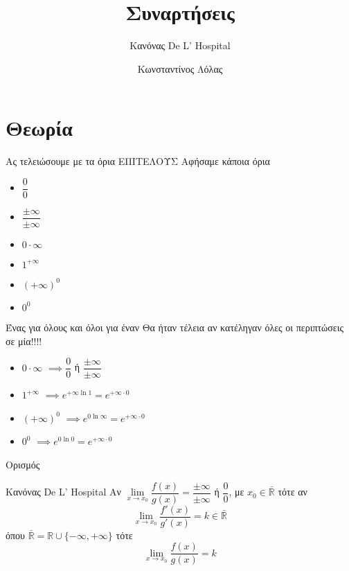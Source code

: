 \documentclass{presentation}
\title{Συναρτήσεις}
\subtitle{Κανόνας De L' Hospital}
\author[Λόλας]{Κωνσταντίνος Λόλας}
\institute[$10^ο$ ΓΕΛ]{$10^ο$ ΓΕΛ Θεσσαλονίκης}
\date{}
\begin{document}
\begin{frame}
    \titlepage
\end{frame}

\section{Θεωρία}
\begin{frame}{Ας τελειώσουμε με τα όρια ΕΠΙΤΕΛΟΥΣ}
    Αφήσαμε κάποια όρια
    \begin{itemize}
        \item $\dfrac{0}{0}$
        \item $\dfrac{\pm\infty}{\pm\infty}$
        \item $0\cdot \infty$
        \item $1^{+\infty}$
        \item $(+\infty)^0$
        \item $0^0$
    \end{itemize}
\end{frame}

\begin{frame}{Ένας για όλους και όλοι για έναν}
    Θα ήταν τέλεια αν κατέληγαν όλες οι περιπτώσεις σε μία!!!!
    \begin{itemize}
        \item<1-> $0\cdot \infty$ $\implies \dfrac{0}{0}$ ή $\dfrac{\pm\infty}{\pm\infty}$
        \item<3-> $1^{+\infty}$  $\implies e^{+\infty\ln 1}=e^{+\infty\cdot 0}$
        \item<5-> $(+\infty)^0$  $\implies e^{0\ln\infty}=e^{+\infty\cdot 0}$
        \item<7-> $0^0$  $\implies e^{0\ln 0}=e^{+\infty\cdot 0}$
    \end{itemize}
\end{frame}

\begin{frame}{Ορισμός}
    \begin{block}{Κανόνας De L' Hospital}
        Αν $\lim\limits_{x \to x_0}{ \dfrac{f(x)}{g(x)} }=\dfrac{\pm\infty}{\pm\infty}$ ή $\dfrac{0}{0}$, με $x_0\in\bar{\mathbb{R}}$ τότε αν
        $$\lim\limits_{x \to x_0}{ \dfrac{f'(x)}{g'(x)} }=k\in\bar{\mathbb{R}}$$
        όπου $\bar{\mathbb{R}}=\mathbb{R}\cup \{-\infty,+\infty\}$ τότε
        $$\lim\limits_{x \to x_0}{ \dfrac{f(x)}{g(x)} }=k$$
    \end{block}
\end{frame}
\end{document}
